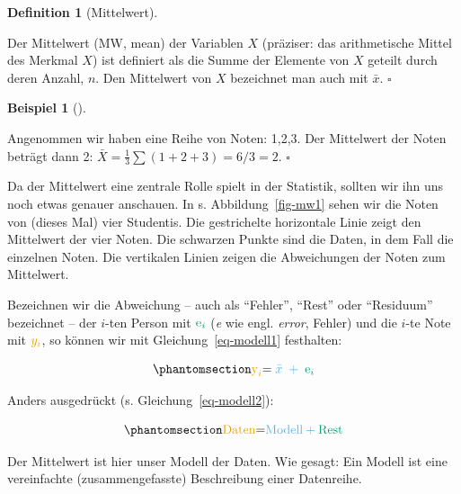 \documentclass[
  letterpaper,
]{scrbook}
\theoremstyle{definition}
\newtheorem{example}{Beispiel}[chapter]
\theoremstyle{definition}
\newtheorem{definition}{Definition}[chapter]
\theoremstyle{definition}
\theoremstyle{remark}
\begin{document}
\begin{definition}[Mittelwert]\protect\hypertarget{def-mw}{}\label{def-mw}

Der Mittelwert (MW, mean) der Variablen \(X\) (präziser: das
arithmetische Mittel des Merkmal \(X\)) ist definiert als die Summe der
Elemente von \(X\) geteilt durch deren Anzahl, \(n\). Den Mittelwert von
\(X\) bezeichnet man auch mit \(\bar {x}\). \(\square\)

\end{definition}

\begin{example}[]\protect\hypertarget{exm-mw1}{}\label{exm-mw1}

Angenommen wir haben eine Reihe von Noten: 1,2,3. Der Mittelwert der
Noten beträgt dann 2: \(\bar{X} = \frac{1}{3}\sum (1+2+3) = 6/3 = 2\).
\(\square\)

\end{example}

Da der Mittelwert eine zentrale Rolle spielt in der Statistik, sollten
wir ihn uns noch etwas genauer anschauen. In s. Abbildung~\ref{fig-mw1}
sehen wir die Noten von (dieses Mal) vier Studentis. Die gestrichelte
horizontale Linie zeigt den Mittelwert der vier Noten. Die schwarzen
Punkte sind die Daten, in dem Fall die einzelnen Noten. Die vertikalen
Linien zeigen die Abweichungen der Noten zum Mittelwert.

Bezeichnen wir die Abweichung -- auch als ``Fehler'', ``Rest'' oder
``Residuum'' bezeichnet -- der \(i\)-ten Person mit
\(\color{errorcol}{\text{e}_i}\) (\emph{e} wie engl. \emph{error},
Fehler) und die \(i\)-te Note mit \(\color{ycol}{y_i}\), so können wir
mit Gleichung~\ref{eq-modell1} festhalten:

\begin{equation}\phantomsection\label{eq-modell1}{\color{ycol}{\text{y}_i} \color{black}{ = } \color{modelcol}{\;\bar{x}\;} + \color{errorcol}{\;\text{e}_i}}\end{equation}

Anders ausgedrückt (s. Gleichung~\ref{eq-modell2}):

\begin{equation}\phantomsection\label{eq-modell2}{\color{ycol}{\text{Daten}} \color{black}{ = }     \color{modelcol}{\text{Modell}} + 
\color{errorcol}{\text{Rest}}}\end{equation}

Der Mittelwert ist hier unser Modell der Daten. Wie gesagt: Ein Modell
ist eine vereinfachte (zusammengefasste) Beschreibung einer Datenreihe.
\end{document}
